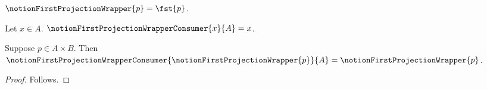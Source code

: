 

\begin{definition}\label{notion_first_projection_wrapper_def}
    $\notionFirstProjectionWrapper{p}=\fst{p}$.
\end{definition}

\begin{definition}\label{notion_first_projection_wrapper_consumer}
    Let $x\in A$.
    $\notionFirstProjectionWrapperConsumer{x}{A}=x$.
\end{definition}

\begin{proposition}\label{notion_first_projection_wrapper_rejected}
    Suppose $p\in A\times B$.
    Then $\notionFirstProjectionWrapperConsumer
        {\notionFirstProjectionWrapper{p}}{A}
        =\notionFirstProjectionWrapper{p}$.
\end{proposition}
\begin{proof}
    Follows.
\end{proof}
